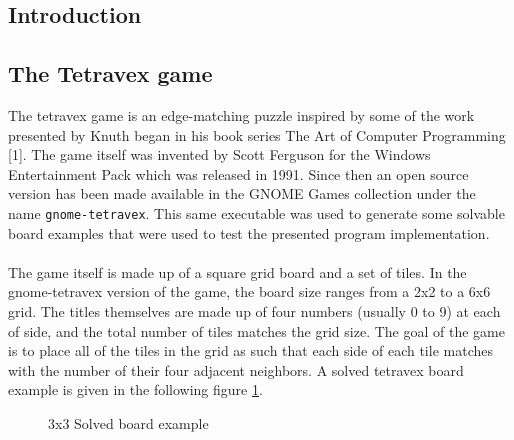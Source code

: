 \documentclass[11pt]{article}
\begin{document}
\begin{multicols*}{2}
  \section{Introduction}
  \subsection{The Tetravex game}
  The tetravex game is an edge-matching puzzle inspired by some of the work
  presented by Knuth began in his book series The Art of Computer Programming
  [1]. The game itself was invented by Scott Ferguson for the Windows
  Entertainment Pack which was released in 1991. Since then an open source
  version has been made available in the GNOME Games collection under the name
  \texttt{gnome-tetravex}. This same executable was used to generate some
  solvable board examples that were used to test the presented program
  implementation.\\\\ The game itself is made up of a square grid board and a
  set of tiles. In the gnome-tetravex version of the game, the board size ranges
  from a 2x2 to a 6x6 grid. The titles themselves are made up of four numbers
  (usually 0 to 9) at each of side, and the total number of tiles matches the
  grid size. The goal of the game is to place all of the tiles in the grid as
  such that each side of each tile matches with the number of their four
  adjacent neighbors. A solved tetravex board example is given in the following
  figure
  \ref{fig:solved-board-example}.
\begin{figure}[H]
  \centering
  \fontsize{11pt}{11pt}\selectfont
  \begin{varwidth}{\linewidth}
    
  \end{varwidth}
  \caption{3x3 Solved board example}
  \label{fig:solved-board-example}
\end{figure}

\end{multicols*}
\end{document}
